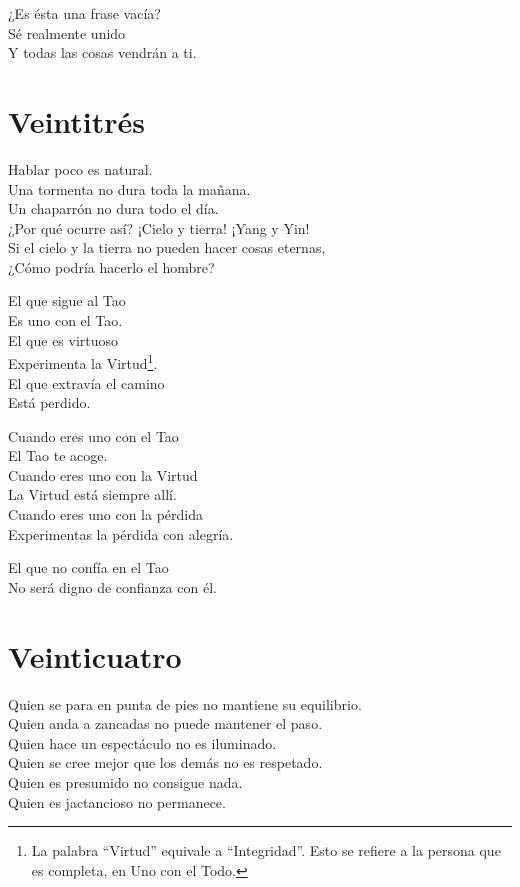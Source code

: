 \documentclass[book,b5paper,hidelinks,final]{memoir}
\begin{document}
	¿Es ésta una frase vacía?\\
	Sé realmente unido\\
	Y todas las cosas vendrán a ti.
	
	\chapter*{Veintitrés}
	
	Hablar poco es natural.\\
	Una tormenta no dura toda la mañana.\\
	Un chaparrón no dura todo el día.\\
	¿Por qué ocurre así? ¡Cielo y tierra! ¡Yang y Yin!\\
	Si el cielo y la tierra no pueden hacer cosas eternas,\\
	¿Cómo podría hacerlo el hombre?
	
	El que sigue al Tao\\
	Es uno con el Tao.\\
	El que es virtuoso\\
	Experimenta la Virtud\footnote{La palabra ``Virtud'' equivale a ``Integridad''. Esto se refiere a la
		persona que es completa, en Uno con el Todo.}.\\
	El que extravía el camino\\
	Está perdido.
	
	Cuando eres uno con el Tao\\
	El Tao te acoge.\\
	Cuando eres uno con la Virtud\\
	La Virtud está siempre allí.\\
	Cuando eres uno con la pérdida\\
	Experimentas la pérdida con alegría.
	
	El que no confía en el Tao\\
	No será digno de confianza con él.
	
	\chapter*{Veinticuatro}
	
	Quien se para en punta de pies no mantiene su equilibrio.\\
	Quien anda a zancadas no puede mantener el paso.\\
	Quien hace un espectáculo no es iluminado.\\
	Quien se cree mejor que los demás no es respetado.\\
	Quien es presumido no consigue nada.\\
	Quien es jactancioso no permanece.
	
\end{document}
